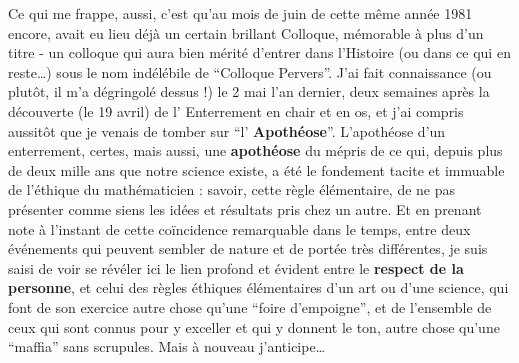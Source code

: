 Ce qui me frappe, aussi, c'est qu'au mois de juin de cette même année 1981 encore, avait eu lieu déjà un certain brillant Colloque, mémorable à plus d'un titre - un colloque qui aura bien mérité d'entrer dans l'Histoire (ou dans ce qui en reste\ldots) sous le nom indélébile de ``Colloque Pervers''. J'ai fait connaissance (ou plutôt, il m'a dégringolé dessus !) le 2 mai l'an dernier, deux semaines après la découverte (le 19 avril) de l' Enterrement en chair et en os, et j'ai compris aussitôt que je venais de tomber sur ``l' \textbf{Apothéose}''. L'apothéose d'un enterrement, certes, mais aussi, une \textbf{apothéose} du mépris de ce qui, depuis plus de deux mille ans que notre science existe, a été le fondement tacite et immuable de l'éthique du mathématicien : savoir, cette règle élémentaire, de ne pas présenter comme siens les idées et résultats pris chez un autre. Et en prenant note à l'instant de cette coïncidence remarquable dans le temps, entre deux événements qui peuvent sembler de nature et de portée très différentes, je suis saisi de voir se révéler ici le lien profond et évident entre le \textbf{respect de la personne}, et celui des règles éthiques élémentaires d'un art ou d'une science, qui font de son exercice autre chose qu'une ``foire d'empoigne'', et de l'ensemble de ceux qui sont connus pour y exceller et qui y donnent le ton, autre chose qu'une ``maffia'' sans scrupules. Mais à nouveau j'anticipe\ldots

